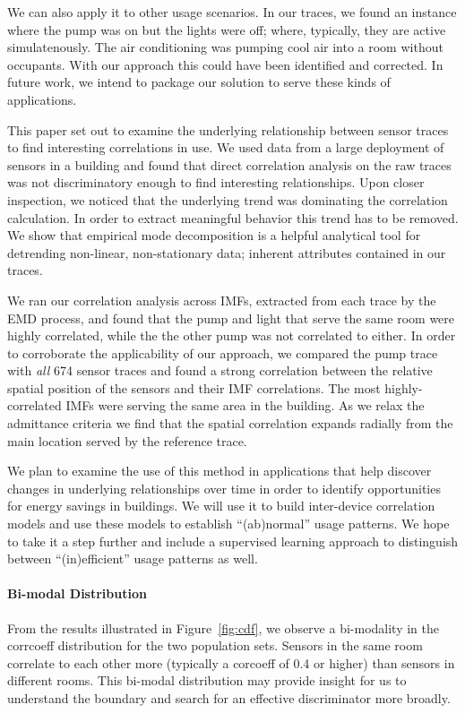 We can also apply it to other usage scenarios.  In our traces, we found an instance where the pump
was on but the lights were off; where, typically, they are active simulatenously.
The air conditioning was pumping cool air into a room without occupants.
With our approach this could have been identified and corrected.  In future work, we intend to
package our solution to serve these kinds of applications.


This paper set out to examine the underlying relationship between sensor traces to find interesting correlations
in use.  We used data from a large deployment of sensors in a building and found that direct correlation analysis on the raw
traces was not discriminatory enough to find interesting relationships.  Upon closer inspection, we noticed that
the underlying trend was dominating the correlation calculation.  In order to extract meaningful behavior this trend has
to be removed.  We show that empirical mode decomposition is a helpful analytical tool for detrending 
non-linear, non-stationary data; inherent attributes contained in our traces.

We ran our correlation analysis across IMFs, extracted from each trace by the EMD process, and found that the pump and light
that serve the same room were highly correlated, while the the other pump was not correlated to either.
In order to corroborate the applicability
of our approach, we compared the pump trace with \emph{all} 674 sensor traces and found a strong correlation
between the relative spatial position of the sensors and their IMF correlations.  The most highly-correlated IMFs were 
serving the same
area in the building.  As we relax the admittance criteria we find that the spatial correlation expands radially from
the main location served by the reference trace.

We plan to examine the use of this method in applications that help discover changes in underlying relationships over time
in order to identify opportunities for energy savings in buildings.  We will use it to build inter-device correlation models
and use these models to establish ``(ab)normal'' usage patterns.  We hope to take it a step further and include a
supervised learning approach to distinguish between ``(in)efficient'' usage patterns as well.


\paragraph{Bi-modal Distribution} From the results illustrated in Figure~\ref{fig:cdf}, we observe a bi-modality in the corrcoeff 
distribution for the two population sets.  Sensors in the same room correlate to each other more (typically a corcoeff of 0.4 or higher)
than sensors in different rooms.  %
This bi-modal distribution may provide insight for us to 
understand the boundary and search for an effective discriminator more broadly.

